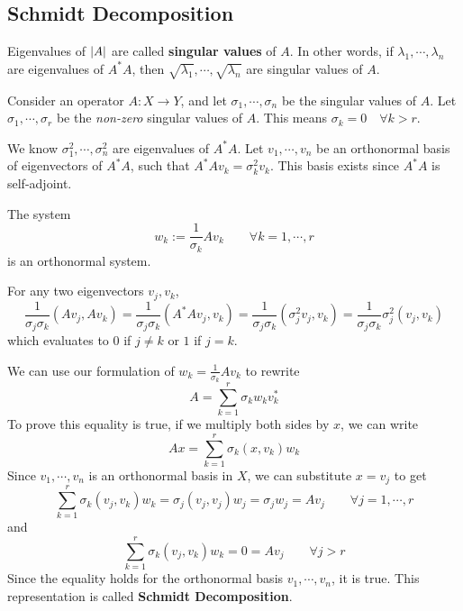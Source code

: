 \subsection{Schmidt Decomposition}

\begin{definition}
Eigenvalues of $\lvert A\rvert$ are called \textbf{singular values} of $A$. In other words, if $\lambda_{1}, \cdots, \lambda_{n}$ are eigenvalues of $A^{*}A$, then $\sqrt{\lambda_{1}}, \cdots, \sqrt{\lambda_{n}}$ are singular values of $A$. 
\end{definition}

Consider an operator $A : X \rightarrow Y$, and let $\sigma_{1}, \cdots, \sigma_{n}$ be the singular values of $A$. Let $\sigma_{1}, \cdots, \sigma_{r}$ be the \textit{non-zero} singular values of $A$. This means $\sigma_{k} = 0 \quad \forall k > r$. 

We know $\sigma_{1}^{2}, \cdots, \sigma_{n}^{2}$ are eigenvalues of $A^{*}A$. Let $v_{1}, \cdots, v_{n}$ be an orthonormal basis of eigenvectors of $A^{*}A$, such that $A^{*}Av_{k} = \sigma_{k}^{2} v_{k}$. This basis exists since $A^{*}A$ is self-adjoint. 

\begin{lemma}
The system 
$$w_{k} := \frac{1}{\sigma_{k}} Av_{k} \qquad \forall k = 1, \cdots, r$$
is an orthonormal system. 
\end{lemma}

\begin{lproof}
For any two eigenvectors $v_{j}, v_{k}$, 
$$\frac{1}{\sigma_{j} \sigma_{k}} (Av_{j}, Av_{k}) = \frac{1}{\sigma_{j} \sigma_{k}} (A^{*} Av_{j}, v_{k}) = \frac{1}{\sigma_{j} \sigma_{k}} (\sigma_{j}^{2} v_{j}, v_{k}) = \frac{1}{\sigma_{j} \sigma_{k}} \sigma_{j}^{2} (v_{j}, v_{k})$$
which evaluates to 0 if $j \neq k$ or $1$ if $j = k$. 
\end{lproof}

\begin{definition}
We can use our formulation of $w_{k} = \frac{1}{\sigma_{k}} Av_{k}$ to rewrite 
$$A = \sum_{k = 1}^{r} \sigma_{k} w_{k} v_{k}^{*}$$
To prove this equality is true, if we multiply both sides by $x$, we can write 
$$Ax = \sum_{k = 1}^{r} \sigma_{k} (x, v_{k}) w_{k}$$
Since $v_{1}, \cdots, v_{n}$ is an orthonormal basis in $X$, we can substitute $x = v_{j}$ to get 
$$\sum_{k = 1}^{r} \sigma_{k} (v_{j}, v_{k}) w_{k} = \sigma_{j} (v_{j}, v_{j}) w_{j} = \sigma_{j} w_{j} = Av_{j} \qquad \forall j = 1, \cdots, r$$
and 
$$\sum_{k = 1}^{r} \sigma_{k} (v_{j}, v_{k}) w_{k} = 0 = Av_{j} \qquad \forall j > r$$
Since the equality holds for the orthonormal basis $v_{1}, \cdots, v_{n}$, it is true. This representation is called \textbf{Schmidt Decomposition}.
\end{definition}

